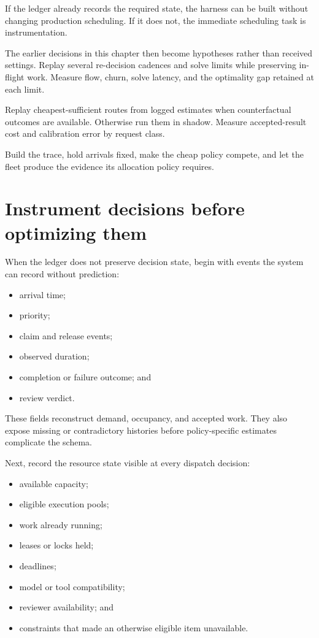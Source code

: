 If the ledger already records the required state, the harness can be built without changing production scheduling. If it does not, the immediate scheduling task is instrumentation.

The earlier decisions in this chapter then become hypotheses rather than received settings. Replay several re-decision cadences and solve limits while preserving in-flight work. Measure flow, churn, solve latency, and the optimality gap retained at each limit.

Replay cheapest-sufficient routes from logged estimates when counterfactual outcomes are available. Otherwise run them in shadow. Measure accepted-result cost and calibration error by request class.

Build the trace, hold arrivals fixed, make the cheap policy compete, and let the fleet produce the evidence its allocation policy requires.

\section{Instrument decisions before optimizing them}\label{instrument-decisions-before-optimizing-them}

When the ledger does not preserve decision state, begin with events the system can record without prediction:

\begin{itemize}
\tightlist
\item
  arrival time;
\item
  priority;
\item
  claim and release events;
\item
  observed duration;
\item
  completion or failure outcome; and
\item
  review verdict.
\end{itemize}

These fields reconstruct demand, occupancy, and accepted work. They also expose missing or contradictory histories before policy-specific estimates complicate the schema.

Next, record the resource state visible at every dispatch decision:

\begin{itemize}
\tightlist
\item
  available capacity;
\item
  eligible execution pools;
\item
  work already running;
\item
  leases or locks held;
\item
  deadlines;
\item
  model or tool compatibility;
\item
  reviewer availability; and
\item
  constraints that made an otherwise eligible item unavailable.
\end{itemize}

